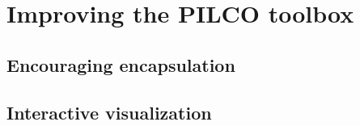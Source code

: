 \documentclass[main.tex]{subfiles}
\begin{document}
\section{Improving the PILCO toolbox}


\subsection{Encouraging encapsulation}

\subsection{Interactive visualization}
\end{document}
